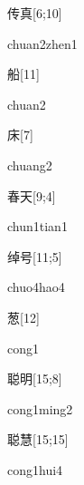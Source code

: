 \begin{verbete}{传真}[6;10]
\begin{pronuncia}{chuan2zhen1}
\end{pronuncia}
\end{verbete}

\begin{verbete}[chuan2]{船}[11]
\begin{pronuncia}{chuan2}
\end{pronuncia}
\end{verbete}

\begin{verbete}[chuang2]{床}[7]
\begin{pronuncia}{chuang2}
\end{pronuncia}
\end{verbete}

\begin{verbete}{春天}[9;4]
\begin{pronuncia}{chun1tian1}
\end{pronuncia}
\end{verbete}

\begin{verbete}{绰号}[11;5]
\begin{pronuncia}{chuo4hao4}
\end{pronuncia}
\end{verbete}

\begin{verbete}[cong1]{葱}[12]
\begin{pronuncia}{cong1}
\end{pronuncia}
\end{verbete}

\begin{verbete}{聪明}[15;8]
\begin{pronuncia}{cong1ming2}
\end{pronuncia}
\end{verbete}

\begin{verbete}{聪慧}[15;15]
\begin{pronuncia}{cong1hui4}
\end{pronuncia}
\end{verbete}

